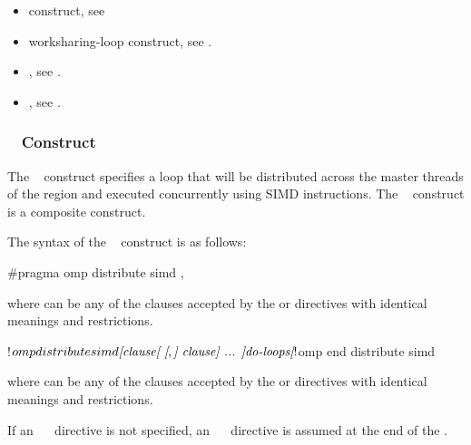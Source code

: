 \crossreferences
\begin{itemize}
\item {} construct, see

\item worksharing-loop construct, see
.

\item {}, see .
\item {}, see
.
\end{itemize}



\subsubsection{~ Construct}
\label{subsec:distribute simd Construct}
\summary
The ~ construct specifies a loop that will be 
distributed across the master threads of the  region and executed 
concurrently using SIMD instructions. The ~ 
construct is a composite construct.

\syntax
The syntax of the ~ construct is as follows:

\begin{ccppspecific}
\begin{ompcPragma}
#pragma omp distribute simd \plc{[clause[ [},\plc{] clause] ... ] newline}
\end{ompcPragma}

where  can be any of the clauses accepted by the  
or  directives with identical meanings and restrictions.
\end{ccppspecific}

\begin{fortranspecific}
\begin{ompfPragma}
!$omp distribute simd \plc{[clause[ [},\plc{] clause] ... ]}
   \plc{do-loops}
\plc{[}!$omp end distribute simd\plc{]}
\end{ompfPragma}

where  can be any of the clauses accepted by the  
or  directives with identical meanings and restrictions.

If an ~~ directive is not specified, an 
~~ directive is assumed at the end of 
the .
\end{fortranspecific}

